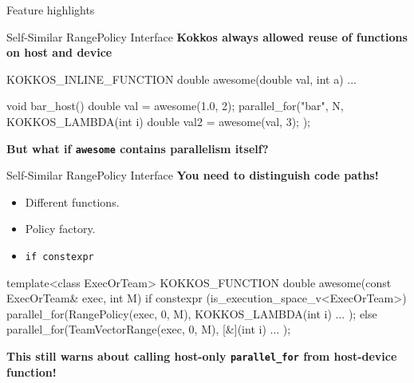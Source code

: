 
\begin{frame}[fragile]

  {\Huge Feature highlights}

  \vspace{10pt}

\end{frame}


\begin{frame}[fragile]{Self-Similar RangePolicy Interface}
   \textbf{Kokkos always allowed reuse of functions on host and device}

\begin{code}[keywords={awesome,template,TeamVectorRange,is_execution_space_v,class,const,KOKKOS_FUNCTION,KOKKOS_INLINE_FUNCTION,KOKKOS_LAMBDA,void,parallel_for,Kokkos,RangePolicy}]
  KOKKOS_INLINE_FUNCTION
  double awesome(double val, int a) {...}

  void bar_host() {
    double val = awesome(1.0, 2);
    parallel_for("bar", N, KOKKOS_LAMBDA(int i) {
      double val2 = awesome(val, 3);
    });
  }
\end{code}

\pause
\vspace{1cm}
\begin{center}
\textbf{But what if \texttt{awesome} contains parallelism itself?}
\end{center}
\end{frame}

\begin{frame}[fragile]{Self-Similar RangePolicy Interface}
   \textbf{You need to distinguish code paths!}
\begin{itemize}
  \item Different functions.
  \item Policy factory.
  \item \texttt{if constexpr}
\end{itemize}

\begin{code}[keywords={awesome,template,TeamVectorRange,is_execution_space_v,class,const,KOKKOS_FUNCTION,KOKKOS_INLINE_FUNCTION,KOKKOS_LAMBDA,void,parallel_for,Kokkos,RangePolicy}]
  template<class ExecOrTeam>
  KOKKOS_FUNCTION double awesome(const ExecOrTeam& exec, int M) {
    if constexpr (is_execution_space_v<ExecOrTeam>) {
      parallel_for(RangePolicy(exec, 0, M), KOKKOS_LAMBDA(int i) {
        ...
      });
    } else {
      parallel_for(TeamVectorRange(exec, 0, M), [&](int i) {
        ...
      });
  } }
\end{code}

\pause
\textbf{This still warns about calling host-only \texttt{parallel\_for} from host-device function!}
\end{frame}

